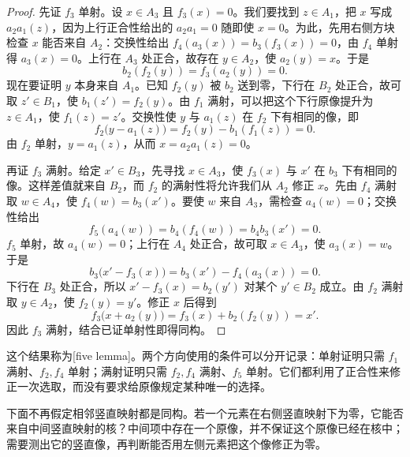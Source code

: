 \begin{proof}
	先证 \(f_3\) 单射。设 \(x\in A_3\) 且 \(f_3(x)=0\)。我们要找到 \(z\in A_1\)，把 \(x\) 写成 \(a_2a_1(z)\)，因为上行正合性给出的 \(a_2a_1=0\) 随即使 \(x=0\)。为此，先用右侧方块检查 \(x\) 能否来自 \(A_2\)：交换性给出 \(f_4(a_3(x))=b_3(f_3(x))=0\)，由 \(f_4\) 单射得 \(a_3(x)=0\)。上行在 \(A_3\) 处正合，故存在 \(y\in A_2\)，使 \(a_2(y)=x\)。于是
	\[
		b_2(f_2(y))=f_3(a_2(y))=0.
	\]
	现在要证明 \(y\) 本身来自 \(A_1\)。已知 \(f_2(y)\) 被 \(b_2\) 送到零，下行在 \(B_2\) 处正合，故可取 \(z'\in B_1\)，使 \(b_1(z')=f_2(y)\)。由 \(f_1\) 满射，可以把这个下行原像提升为 \(z\in A_1\)，使 \(f_1(z)=z'\)。交换性使 \(y\) 与 \(a_1(z)\) 在 \(f_2\) 下有相同的像，即
	\[
		f_2\bigl(y-a_1(z)\bigr)=f_2(y)-b_1(f_1(z))=0.
	\]
	由 \(f_2\) 单射，\(y=a_1(z)\)，从而 \(x=a_2a_1(z)=0\)。

	再证 \(f_3\) 满射。给定 \(x'\in B_3\)，先寻找 \(x\in A_3\)，使 \(f_3(x)\) 与 \(x'\) 在 \(b_3\) 下有相同的像。这样差值就来自 \(B_2\)，而 \(f_2\) 的满射性将允许我们从 \(A_2\) 修正 \(x\)。先由 \(f_4\) 满射取 \(w\in A_4\)，使 \(f_4(w)=b_3(x')\)。要使 \(w\) 来自 \(A_3\)，需检查 \(a_4(w)=0\)；交换性给出
	\[
		f_5(a_4(w))=b_4(f_4(w))=b_4b_3(x')=0.
	\]
	\(f_5\) 单射，故 \(a_4(w)=0\)；上行在 \(A_4\) 处正合，故可取 \(x\in A_3\)，使 \(a_3(x)=w\)。于是
	\[
		b_3\bigl(x'-f_3(x)\bigr)=b_3(x')-f_4(a_3(x))=0.
	\]
	下行在 \(B_3\) 处正合，所以 \(x'-f_3(x)=b_2(y')\) 对某个 \(y'\in B_2\) 成立。由 \(f_2\) 满射取 \(y\in A_2\)，使 \(f_2(y)=y'\)。修正 \(x\) 后得到
	\[
		f_3\bigl(x+a_2(y)\bigr)=f_3(x)+b_2(f_2(y))=x'.
	\]
	因此 \(f_3\) 满射，结合已证单射性即得同构。
\end{proof}

这个结果称为[five lemma]。两个方向使用的条件可以分开记录：单射证明只需 \(f_1\) 满射、\(f_2,f_4\) 单射；满射证明只需 \(f_2,f_4\) 满射、\(f_5\) 单射。它们都利用了正合性来修正一次选取，而没有要求给原像规定某种唯一的选择。

\ProseParagraphBreak
下面不再假定相邻竖直映射都是同构。若一个元素在右侧竖直映射下为零，它能否来自中间竖直映射的核？中间项中存在一个原像，并不保证这个原像已经在核中；需要测出它的竖直像，再判断能否用左侧元素把这个像修正为零。

